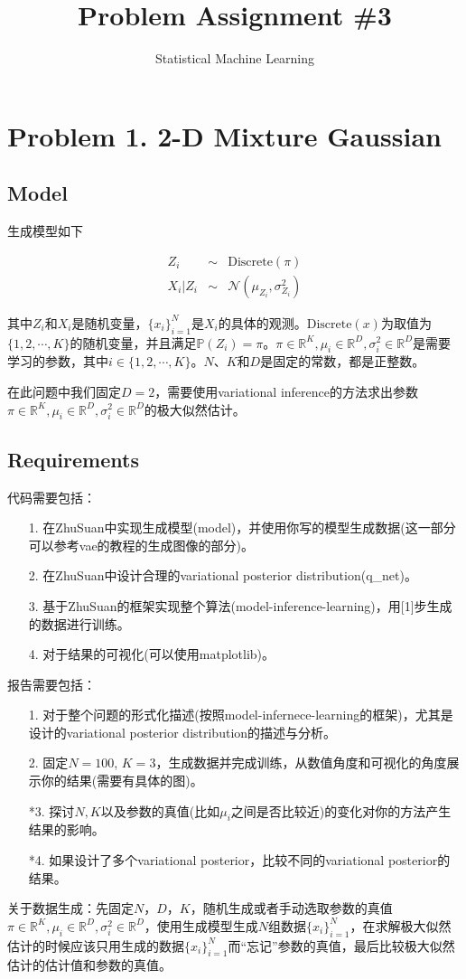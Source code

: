 \documentclass{article}
\title{Problem Assignment \#3}
\author{Statistical Machine Learning}
\date{}
\begin{document}
\maketitle

\section{Problem 1. 2-D Mixture Gaussian}

\subsection{Model}

生成模型如下

\begin{eqnarray}
	Z_i &\sim& \mathrm{Discrete}(\pi) \\
	X_i \lvert Z_i &\sim& \mathcal{N}(\mu_{Z_i}, \sigma^2_{Z_i})
\end{eqnarray}

其中$Z_i$和$X_i$是随机变量，$\{x_i\}_{i=1}^N$是$X_i$的具体的观测。$\mathrm{Discrete}(x)$为取值为$\{1,2,\cdots,K\}$的随机变量，并且满足$\mathbb{P}(Z_i)=\pi$。$\pi \in \mathbb{R}^K, \mu_i \in \mathbb{R}^D, \sigma^2_i \in \mathbb{R}^D$是需要学习的参数，其中$i \in \{1, 2, \cdots, K\}$。$N$、$K$和$D$是固定的常数，都是正整数。

在此问题中我们固定$D=2$，需要使用variational inference的方法求出参数$\pi \in \mathbb{R}^K, \mu_i \in \mathbb{R}^D, \sigma^2_i \in \mathbb{R}^D$的极大似然估计。

\subsection{Requirements}

代码需要包括：

\begin{itemize}
	\item [1.] 在ZhuSuan中实现生成模型(model)，并使用你写的模型生成数据(这一部分可以参考vae的教程的生成图像的部分)。
	\item [2.] 在ZhuSuan中设计合理的variational posterior distribution(q\_net)。
	\item [3.] 基于ZhuSuan的框架实现整个算法(model-inference-learning)，用[1]步生成的数据进行训练。
	\item [4.] 对于结果的可视化(可以使用matplotlib)。
\end{itemize}

报告需要包括：

\begin{itemize}
	\item [1.] 对于整个问题的形式化描述(按照model-infernece-learning的框架)，尤其是设计的variational posterior distribution的描述与分析。
	\item [2.] 固定$N=100$, $K=3$，生成数据并完成训练，从数值角度和可视化的角度展示你的结果(需要有具体的图)。
	\item [*3.] 探讨$N, K$以及参数的真值(比如$\mu_i$之间是否比较近)的变化对你的方法产生结果的影响。
	\item [*4.] 如果设计了多个variational posterior，比较不同的variational posterior的结果。
\end{itemize}

关于数据生成：先固定$N$，$D$，$K$，随机生成或者手动选取参数的真值$\pi \in \mathbb{R}^K, \mu_i \in \mathbb{R}^D, \sigma^2_i \in \mathbb{R}^D$，使用生成模型生成$N$组数据$\{x_i\}_{i=1}^N$，在求解极大似然估计的时候应该只用生成的数据$\{x_i\}_{i=1}^N$而“忘记”参数的真值，最后比较极大似然估计的估计值和参数的真值。
\end{document}
